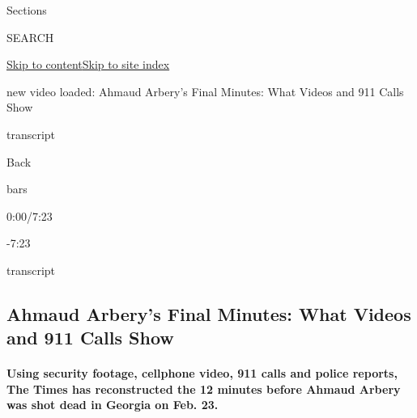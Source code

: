 Sections

SEARCH

\protect\hyperlink{site-content}{Skip to
content}\protect\hyperlink{site-index}{Skip to site index}

new video loaded: Ahmaud Arbery's Final Minutes: What Videos and 911
Calls Show

transcript

Back

bars

0:00/7:23

-7:23

transcript

\hypertarget{ahmaud-arberys-final-minutes-what-videos-and-911-calls-show}{%
\subsection{Ahmaud Arbery's Final Minutes: What Videos and 911 Calls
Show}\label{ahmaud-arberys-final-minutes-what-videos-and-911-calls-show}}

\hypertarget{using-security-footage-cellphone-video-911-calls-and-police-reports-the-times-has-reconstructed-the-12-minutes-before-ahmaud-arbery-was-shot-dead-in-georgia-on-feb-23}{%
\paragraph{Using security footage, cellphone video, 911 calls and police
reports, The Times has reconstructed the 12 minutes before Ahmaud Arbery
was shot dead in Georgia on Feb.
23.}\label{using-security-footage-cellphone-video-911-calls-and-police-reports-the-times-has-reconstructed-the-12-minutes-before-ahmaud-arbery-was-shot-dead-in-georgia-on-feb-23}}

